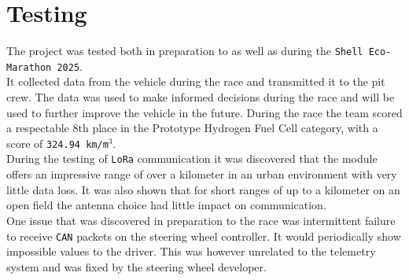 \clearpage
\section{Testing}

The project was tested both in preparation to as well as during the \verb|Shell Eco-Marathon 2025|.\\

It collected data from the vehicle during the race and transmitted it to the pit crew. The data was used to make informed decisions during the race and
will be used to further improve the vehicle in the future. During the race the team scored a respectable 8th place in the Prototype Hydrogen Fuel Cell category,
with a score of \texttt{324.94~km/m$^3$}.\\

During the testing of \verb|LoRa| communication it was discovered that the module offers an impressive range of
over a kilometer in an urban environment with very little data loss. It was also shown that for short ranges of up to
a kilometer on an open field the antenna choice had little impact on communication.\\

One issue that was discovered in preparation to the race was intermittent failure to receive \verb|CAN| packets on the steering wheel controller.
It would periodically show impossible values to the driver. This was however unrelated to the telemetry system and was fixed by the steering wheel developer.